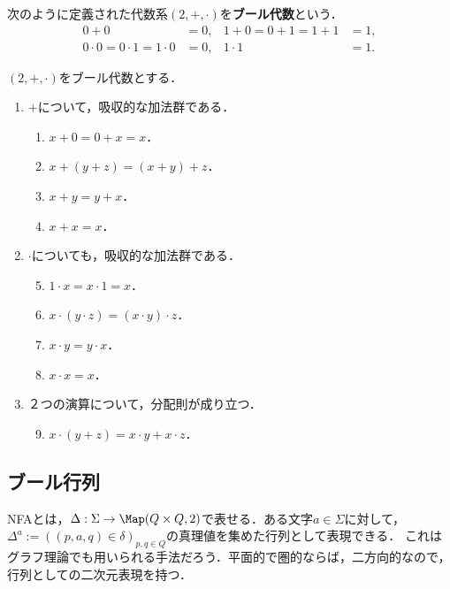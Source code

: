 \begin{definition}
    次のように定義された代数系$(2,+,\cdot)$を\textbf{ブール代数}という．
    \begin{align*}
        0+0&=0,&1+0=0+1=1+1&=1,\\
        0\cdot 0=0\cdot 1=1\cdot 0&=0,&1\cdot 1&=1.
    \end{align*}
\end{definition}

\begin{proposition}
    $(2,+,\cdot)$をブール代数とする．
    \begin{enumerate}
    \item $+$について，吸収的な加法群である．
    \begin{enumerate}[(1)]
        \item $x+0=0+x=x$．
        \item $x+(y+z)=(x+y)+z$．
        \item $x+y=y+x$．
        \item $x+x=x$．
    \end{enumerate}
    \item $\cdot$についても，吸収的な加法群である．
    \begin{enumerate}[(1)]\setcounter{enumii}{4}
        \item $1\cdot x=x\cdot 1=x$．
        \item $x\cdot(y\cdot z)=(x\cdot y)\cdot z$．
        \item $x\cdot y=y\cdot x$．
        \item $x\cdot x=x$．
    \end{enumerate}
    \item ２つの演算について，分配則が成り立つ．
    \begin{enumerate}[(1)]\setcounter{enumii}{8}
        \item $x\cdot(y+z)=x\cdot y+x\cdot z$．
    \end{enumerate}
    \end{enumerate}
\end{proposition}

\subsection{ブール行列}

\begin{tcolorbox}[colframe=ForestGreen, colback=ForestGreen!10!white, breakable]
    NFAとは，$\Delta:\Sigma\to\Map(Q\times Q,2)$で表せる．ある文字$a\in\Sigma$に対して，$\Delta^a:=((p,a,q)\in\delta)_{p,q\in Q}$の真理値を集めた行列として表現できる．
    これはグラフ理論でも用いられる手法だろう．平面的で圏的ならば，二方向的なので，行列としての二次元表現を持つ．
\end{tcolorbox}

